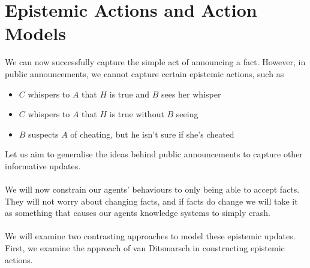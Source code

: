 \documentclass[12pt, a4paper, titlepage]{scrartcl}
\begin{document}
\section{Epistemic Actions and Action Models} \label{estAct}
We can now successfully capture the simple act of announcing a fact.
However, in public announcements, we cannot capture certain epistemic actions,
such as
\begin{itemize} 
  \item $C$ whispers to $A$ that $H$ is true and $B$ sees her whisper
  \item $C$ whispers to $A$ that $H$ is true without $B$ seeing
  \item $B$ suspects $A$ of cheating, but he isn't sure if she's cheated
\end{itemize}
Let us aim to generalise the ideas behind public announcements to capture other
informative updates.\\
\\
We will now constrain our agents' behaviours to only being able to accept facts.
They will not worry about changing facts, and if facts do change we will take it
as something that causes our agents knowledge systems to simply crash.\\
\\
We will examine two contrasting approaches to model these epistemic updates.
First, we examine the approach of van Ditsmarsch in constructing epistemic
actions.
\end{document}

